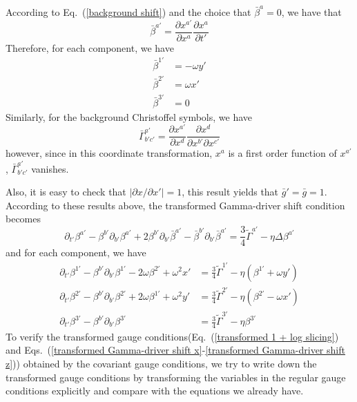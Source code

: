 According to Eq.~(\ref{background shift}) and the choice that ${\bar \beta}^{a} = 0$, we have that
\[
{\bar \beta}^{a'} = \frac{\partial x^{a'}}{\partial x^{a}}\frac{\partial x^{a}}{\partial t'}
\]
Therefore, for each component, we have
\begin{align*}
{\bar \beta}^{1'} & = -\omega y'\\
{\bar \beta}^{2'} & = \omega x'\\
{\bar \beta}^{3'} & = 0
\end{align*}
Similarly, for the background Christoffel symbols, we have
\[
{\bar \Gamma}^{a'}_{b'c'} = \frac{\partial x^{a'}}{\partial x^{d}}\frac{\partial x^{d}}{\partial x^{b'}\partial x^{c'}}
\]
however, since in this coordinate transformation, $x^{a}$ is a first order function of $x^{a'}$, ${\bar \Gamma}^{a'}_{b'c'}$ vanishes. 

Also, it is easy to check that $\left|\partial x/\partial x'\right| = 1$, this result yields that ${\bar g}' = {\bar g} = 1$. According to these results above, the transformed Gamma-driver shift condition becomes
\begin{equation}
\partial_{t'}\beta^{a'} - \beta^{b'}\partial_{b'}\beta^{a'} + 2\beta^{b'}\partial_{b'}{\bar \beta}^{a'} - {\bar \beta}^{b'}\partial_{b'}{\bar \beta}^{a'} = \frac{3}{4}{\tilde \Gamma}^{a'} - \eta \Delta \beta^{a'}
\end{equation}
and for each component, we have
\begin{align}
\partial_{t'}\beta^{1'} - \beta^{b'}\partial_{b'}\beta^{1'} - 2\omega\beta^{2'} + \omega^{2}x' &= \frac{3}{4}{\tilde \Gamma}^{1'} - \eta \left(\beta^{1'} + \omega y'\right)\label{transformed Gamma-driver shift x}\\
\partial_{t'}\beta^{2'} - \beta^{b'}\partial_{b'}\beta^{2'} + 2\omega\beta^{1'} + \omega^{2}y' &= \frac{3}{4}{\tilde \Gamma}^{2'} - \eta \left(\beta^{2'} - \omega x'\right)\label{transformed Gamma-driver shift y}\\
\partial_{t'}\beta^{3'} - \beta^{b'}\partial_{b'}\beta^{3'} & = \frac{3}{4}{\tilde \Gamma}^{3'} - \eta \beta^{3'}\label{transformed Gamma-driver shift z}
\end{align}
To verify the transformed gauge conditions(Eq.~(\ref{transformed 1 + log slicing}) and Eqs.~(\ref{transformed Gamma-driver shift x}-\ref{transformed Gamma-driver shift z})) obtained by the covariant gauge conditions, we try to write down the transformed gauge conditions by transforming the variables in the regular gauge conditions explicitly and compare with the equations we already have. 

